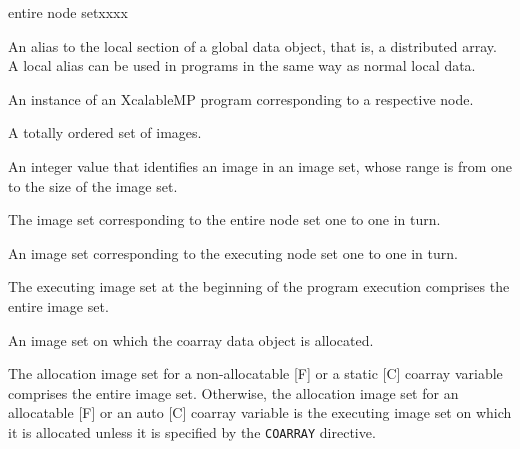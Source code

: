 \begin{namelist}{entire node setxxxx}


 An alias to the local section of a global data object, that is, a distributed
 array. A local alias can be used in {\XMP} programs in the same way as
 normal local data.

%
%


An instance of an XcalableMP program corresponding to a respective node.


A totally ordered set of images.


An integer value that identifies an image in an image set,
whose range is from one to the size of the image set.



The image set corresponding to the entire node set
one to one in turn.


An image set corresponding to the executing node set 
one to one in turn.

The executing image set at the beginning of the program execution
comprises the entire image set.


An image set on which the coarray data object is allocated.

The allocation image set for a non-allocatable [F] or a static [C] 
coarray variable comprises the entire image set.
Otherwise, 
the allocation image set for an allocatable [F] or an auto [C] 
coarray variable is the executing image set on which it is allocated
unless it is specified by the {\tt COARRAY} directive.


\end{namelist}
